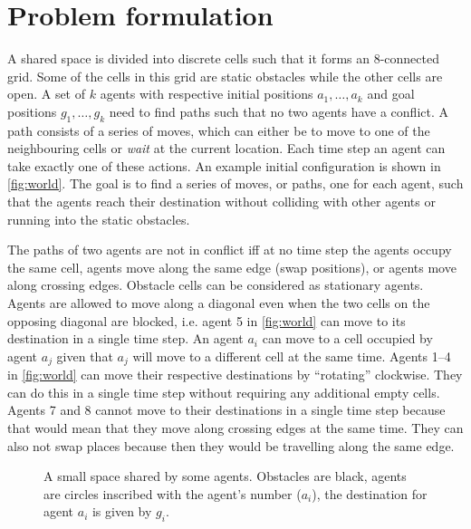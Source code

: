 \section{Problem formulation}\label{sec:problem}
A shared space is divided into discrete cells such that it forms an 8-connected
grid. Some of the cells in this grid are static obstacles while the other cells
are open. A set of $k$ agents with respective initial positions $a_1, \ldots,
a_k$ and goal positions $g_1, \ldots, g_k$ need to find paths such that no two
agents have a conflict. A path consists of a series of moves, which can either
be to move to one of the neighbouring cells or \emph{wait} at the current
location. Each time step an agent can take exactly one of these actions.
An example initial configuration is shown in \autoref{fig:world}. The goal is
to find a series of moves, or paths, one for each agent, such that the agents
reach their destination without colliding with other agents or running into the
static obstacles.

The paths of two agents are not in conflict iff at no time step the agents
occupy the same cell, agents move along the same edge (swap positions), or
agents move along
crossing edges. Obstacle cells can be considered as stationary agents. Agents
are allowed to move along a diagonal even when the two cells on the opposing
diagonal are blocked, i.e. agent 5 in \autoref{fig:world} can move to its
destination in a single time step. An agent $a_i$ can move to a cell occupied by
agent $a_j$ given that $a_j$ will move to a different cell at the same time.
Agents 1--4 in \autoref{fig:world} can move their respective destinations
by ``rotating'' clockwise. They can do this in a single time step without
requiring any additional empty cells. Agents 7 and 8 cannot move to their
destinations in a single time step because that would mean that they move along
crossing edges at the same time. They can also not swap places because then
they would be travelling along the same edge.

\begin{figure}[h]
    \centering
    \def\svgscale{.7}
    
    \caption{A small space shared by some agents. Obstacles are black, agents
        are circles inscribed with the agent's number ($a_i$), the destination
        for
        agent $a_i$ is given by $g_i$.}
    \label{fig:world}
\end{figure}
